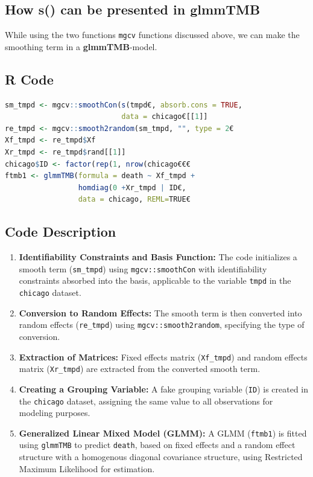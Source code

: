 \documentclass[12pt, twoside,hidelinks]{article}
\theoremstyle{definition}
\numberwithin{equation}{section}
\begin{document}
\newpage


\subsection{How s() can be presented in \textbf{glmmTMB}}\label{sec:makingsmooth:s()}

While using the two functions \texttt{mgcv} functions discussed above, we can make the smoothing term in a \textbf{glmmTMB}-model.


\subsection*{R Code}

\begin{lstlisting}[language=R]
sm_tmpd <- mgcv::smoothCon(s(tmpd€, absorb.cons = TRUE, 
                           data = chicago€[[1]]             
re_tmpd <- mgcv::smooth2random(sm_tmpd, "", type = 2€
Xf_tmpd <- re_tmpd$Xf
Xr_tmpd <- re_tmpd$rand[[1]]
chicago$ID <- factor(rep(1, nrow(chicago€€€
ftmb1 <- glmmTMB(formula = death ~ Xf_tmpd +
                 homdiag(0 +Xr_tmpd | ID€, 
                 data = chicago, REML=TRUE€
\end{lstlisting}

\subsection*{Code Description}

\begin{enumerate}
    \item \textbf{Identifiability Constraints and Basis Function:}
    The code initializes a smooth term (\texttt{sm\_tmpd}) using \texttt{mgcv::smoothCon} with identifiability constraints absorbed into the basis, applicable to the variable \texttt{tmpd} in the \texttt{chicago} dataset.

    \item \textbf{Conversion to Random Effects:}
    The smooth term is then converted into random effects (\texttt{re\_tmpd}) using \texttt{mgcv::smooth2random}, specifying the type of conversion.

    \item \textbf{Extraction of Matrices:}
    Fixed effects matrix (\texttt{Xf\_tmpd}) and random effects matrix (\texttt{Xr\_tmpd}) are extracted from the converted smooth term.

    \item \textbf{Creating a Grouping Variable:}
    A fake grouping variable (\texttt{ID}) is created in the \texttt{chicago} dataset, assigning the same value to all observations for modeling purposes.

    \item \textbf{Generalized Linear Mixed Model (GLMM):}
    A GLMM (\texttt{ftmb1}) is fitted using \texttt{glmmTMB} to predict \texttt{death}, based on fixed effects and a random effect structure with a homogenous diagonal covariance structure, using Restricted Maximum Likelihood for estimation.
\end{enumerate}
\end{document}
